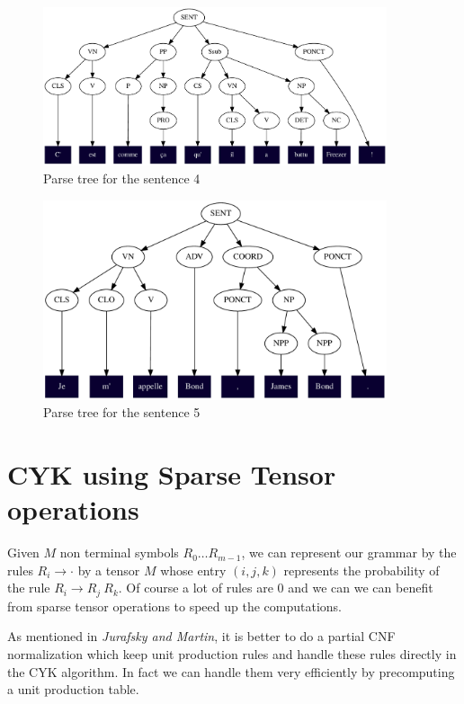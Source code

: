 \documentclass[a4paper, 11pt]{article}
\begin{document}
\begin{figure}[h]
  \centering
  \includegraphics[width=0.9\textwidth]{sent4}
  \caption{Parse tree for the sentence 4}\label{fig:sent4}
\end{figure}

\begin{figure}[h]
  \centering
  \includegraphics[width=0.9\textwidth]{sent5}
  \caption{Parse tree for the sentence 5}\label{fig:sent5}
\end{figure}


\clearpage
\section{CYK using Sparse Tensor operations}
\label{sec:cyk-sparse}

Given $M$ non terminal symbols $R_0 \dots R_{m-1}$, we can represent
our grammar by the rules $R_i \to \cdot$ by a tensor $M$ whose entry
$(i, j, k)$ represents the probability of the rule
$R_i \to R_j \ R_k$.  Of course a lot of rules are $0$ and we can we
can benefit from sparse tensor operations to speed up the
computations.

As mentioned in \emph{Jurafsky and Martin}, it is better to do a
partial CNF normalization which keep unit production rules and handle
these rules directly in the CYK algorithm. In fact we can handle them
very efficiently by precomputing a unit production table.
\end{document}
